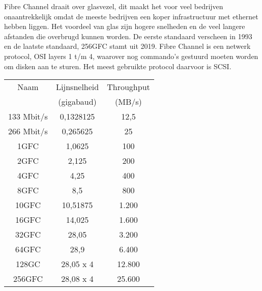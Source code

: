 Fibre Channel draait over glasvezel, dit maakt het voor veel bedrijven onaantrekkelijk omdat de meeste bedrijven een koper infrastructuur met ethernet hebben liggen. Het voordeel van glas zijn hogere snelheden en de veel langere afstanden die overbrugd kunnen worden. De eerste standaard verscheen in 1993 en de laatste standaard, 256GFC stamt uit 2019. Fibre Channel is een netwerk protocol, OSI layers 1 t/m 4, waarover nog commando's gestuurd moeten worden om disken aan te sturen. Het meest gebruikte protocol daarvoor is SCSI.

\begin{center}
\begin{tabular}{ |c|c|c| }
\hline
Naam       & Lijnsnelheid & Throughput \\
           & (gigabaud)   & (MB/s) \\
\hline\hline
133 Mbit/s & 0,1328125    & 12,5 \\
\hline
266 Mbit/s & 0,265625     & 25 \\
\hline
1GFC       & 1,0625       & 100 \\
\hline
2GFC       & 2,125        & 200 \\
\hline
4GFC       & 4,25         & 400 \\
\hline
8GFC       & 8,5          & 800 \\
\hline
10GFC      & 10,51875     & 1.200 \\
\hline
16GFC      & 14,025       & 1.600 \\
\hline
32GFC      & 28,05        & 3.200 \\
\hline
64GFC      & 28,9         & 6.400 \\
\hline
128GC      & 28,05 x 4    & 12.800 \\
\hline
256GFC     & 28,08 x 4    & 25.600 \\
\hline
\end{tabular}
\end{center}
